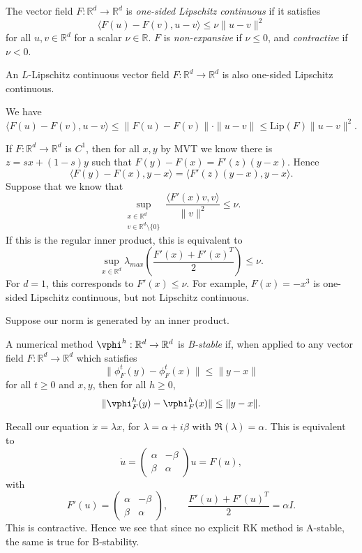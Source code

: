 \documentclass[12pt]{article}
\begin{document}
\begin{definition}
	The vector field $F : \mathbb{R}^{d} \to \mathbb{R}^{d}$ is \emph{one-sided Lipschitz continuous} if it satisfies
	\[
	\langle F(u) - F(v), u - v \rangle \leq \nu \|u - v\|^2
	\]
	for all $u, v \in \mathbb{R}^{d}$ for a scalar $\nu \in \mathbb{R}$. $F$ is \emph{non-expansive} if $\nu \leq 0$, and \emph{contractive} if $\nu < 0$.
\end{definition}

\begin{lemma}
	An $L$-Lipschitz continuous vector field $F : \mathbb{R}^{d} \to \mathbb{R}^{d}$ is also one-sided Lipschitz continuous.
\end{lemma}

\begin{proofbox}
	We have
	\[
	\langle F(u) - F(v), u - v \rangle \leq \|F(u) - F(v)\| \cdot \|u - v\| \leq \mathrm{Lip}(F) \|u - v\|^2.
	\]
\end{proofbox}

If $F : \mathbb{R}^{d} \to \mathbb{R}^{d}$ is $C^1$, then for all $x, y$ by MVT we know  there is $z = s x + (1 - s) y$ such that $F(y) - F(x) = F'(z)(y - x)$. Hence
\[
\langle F(y) - F(x), y - x \rangle = \langle F'(z)(y - x), y - x\rangle.
\]
Suppose that we know that
\[
	\sup_{\substack{x \in \mathbb{R}^{d} \\ v \in \mathbb{R}^{d} \setminus \{0\}}}\frac{\langle F'(x) v, v \rangle}{\|v\|^2} \leq \nu.
\]
If this is the regular inner product, this is equivalent to
\[
\sup_{x \in \mathbb{R}^{d}} \lambda_{max} \left( \frac{F'(x) + F'(x)^{T}}{2} \right) \leq \nu.
\]
For $d = 1$, this corresponds to $F'(x) \leq \nu$. For example, $F(x) = - x^3$ is one-sided Lipschitz continuous, but not Lipschitz continuous.

Suppose our norm is generated by an inner product.

\begin{definition}
	A numerical method $\vphi^{h} : \mathbb{R}^{d} \to \mathbb{R}^{d}$ is \emph{B-stable} if, when applied to any vector field $F : \mathbb{R}^{d} \to \mathbb{R}^{d}$ which satisfies
	\[
	\|\phi_F^{t}(y) - \phi_F^{t}(x)\| \leq \|y - x\|
	\]
	for all $t \geq 0$ and $x, y$, then for all $h \geq 0$,
	\[
	\|\vphi_F^{h}(y) - \vphi_F^{h}(x)\| \leq \|y - x\|.
	\]
\end{definition}

\begin{remark}
	Recall our equation $\dot x = \lambda x$, for $\lambda = \alpha + i \beta$ with $\Re(\lambda) = \alpha$. This is equivalent to
	\[
	\dot u =
	\begin{pmatrix}
		\alpha & - \beta \\ \beta & \alpha
	\end{pmatrix}
	u = F(u),
	\]
	with
	\[
	F'(u) = 
	\begin{pmatrix}
		\alpha & - \beta \\ \beta & \alpha
	\end{pmatrix}, \qquad \frac{F'(u) + F'(u)^{T}}{2} = \alpha I.
	\]
	This is contractive. Hence we see that since no explicit RK method is A-stable, the same is true for B-stability.
\end{remark}
\end{document}
